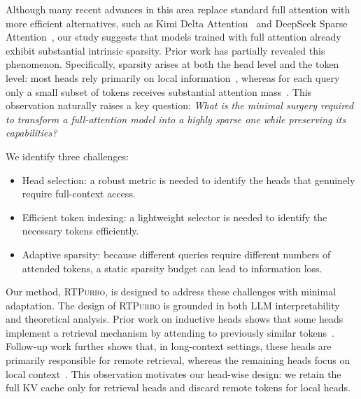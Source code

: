 \documentclass{llmxive}
\providecommand{\name}{{\textsc{RTPurbo}}\xspace}
\providecommand{\hs}[1]{{#1}}
\begin{document}

Although many recent advances in this area replace standard full attention with more efficient alternatives, such as Kimi Delta Attention~\citep{kimiteam2025kimilinearexpressiveefficient} and DeepSeek Sparse Attention~\citep{dsa}, our study suggests that models trained with full attention already exhibit substantial intrinsic sparsity. Prior work has partially revealed this phenomenon. Specifically, sparsity arises at both the head level and the token level: most heads rely primarily on local information~\citep{streamingLLM, razorattn,duoattn}, whereas for each query only a small subset of tokens receives substantial attention mass~\citep{fasa,Quest,snapkv}. This observation naturally raises a key question:
\textit{What is the minimal surgery required to transform a full-attention model into a highly sparse one while preserving its capabilities?}

We identify three challenges:
\begin{itemize}[leftmargin=*, itemindent=0pt, itemsep=3pt, topsep=2pt, parsep=0pt, partopsep=0pt]
\item Head selection: a robust metric is needed to identify the heads that genuinely require full-context access.
\item Efficient token indexing: a lightweight selector is needed to identify the necessary tokens efficiently.
\item Adaptive sparsity: because different queries require different numbers of attended tokens, a static sparsity budget can lead to information loss.
\end{itemize}

Our method, \name, is designed to address these challenges with minimal adaptation.
The design of \name is grounded in both LLM interpretability and theoretical analysis. Prior work on inductive heads shows that some heads implement a retrieval mechanism by attending to previously similar tokens~\citep{olsson2022incontextlearninginductionheads}. Follow-up work further shows that, in long-context settings, these heads are primarily responsible for remote retrieval, whereas the remaining heads focus on local context~\citep{razorattn}. This observation motivates our head-wise design: we retain the full KV cache only for retrieval heads and discard remote tokens for local heads.
\end{document}
